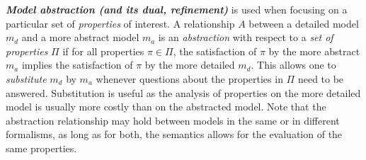 \noindent
\textbf{\emph{Model abstraction (and its dual, refinement)}} is used when focusing on 
    a particular set of \emph{properties} of interest. A relationship $A$ between a detailed model 
    $m_d$ and a more abstract model $m_a$ is an \emph{abstraction} with respect to a 
    \emph{set of properties} $\Pi$ if for all properties $\pi \in \Pi$, the satisfaction of $\pi$ by the more abstract $m_a$ implies the satisfaction of $\pi$ by the more detailed $m_d$. 
    This allows one to \emph{substitute} $m_d$ by $m_a$ whenever questions about the properties in $\Pi$ need to be answered. Substitution is useful as the analysis of properties on the more detailed model is usually more costly
    than on the abstracted model.
    Note that the abstraction relationship may hold between models in the same or in different formalisms, as long as for both, the semantics allows for the evaluation of the same properties.
    
